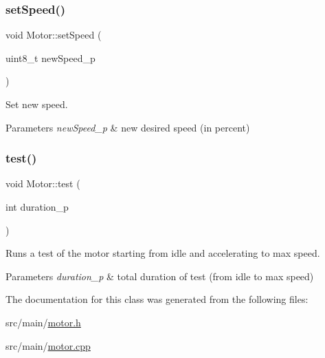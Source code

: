 \subsubsection{\texorpdfstring{set\+Speed()}{setSpeed()}}
{\footnotesize\ttfamily void Motor\+::set\+Speed (\begin{DoxyParamCaption}\item[{uint8\+\_\+t}]{new\+Speed\+\_\+p }\end{DoxyParamCaption})}



Set new speed. 


\begin{DoxyParams}{Parameters}
{\em new\+Speed\+\_\+p} & new desired speed (in percent) \\
\hline
\end{DoxyParams}
\mbox{\label{class_motor_a0c2e15bba82f033dafb3b45ea874692f}} 
\subsubsection{\texorpdfstring{test()}{test()}}
{\footnotesize\ttfamily void Motor\+::test (\begin{DoxyParamCaption}\item[{int}]{duration\+\_\+p }\end{DoxyParamCaption})}



Runs a test of the motor starting from idle and accelerating to max speed. 


\begin{DoxyParams}{Parameters}
{\em duration\+\_\+p} & total duration of test (from idle to max speed) \\
\hline
\end{DoxyParams}


The documentation for this class was generated from the following files\+:\begin{DoxyCompactItemize}
\item 
src/main/\hyperlink{motor_8h}{motor.\+h}\item 
src/main/\hyperlink{motor_8cpp}{motor.\+cpp}\end{DoxyCompactItemize}
